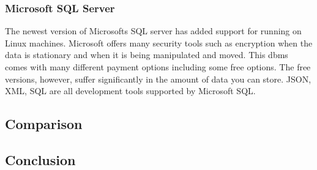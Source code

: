 \documentclass[onecolumn, draftclsnofoot,10pt, compsoc]{IEEEtran}
\begin{document}
		\subsubsection{Microsoft SQL Server}
			The newest version of Microsofts SQL server has added support for running on Linux machines.
			Microsoft offers many security tools such as encryption when the data is stationary and when it is being manipulated and moved\cite{microsoft_comparison}.
			This dbms comes with many different payment options including some free options.
			The free versions, however, suffer significantly in the amount of data you can store.
			JSON, XML, SQL are all development tools supported by Microsoft SQL\cite{microsoft_editions}.

	\subsection{Comparison}
		

	\subsection{Conclusion}



\end{document}
